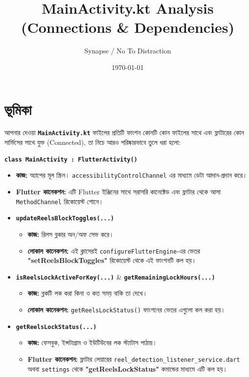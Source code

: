 \documentclass[12pt, a4paper]{article}
\title{\textbf{\Large MainActivity.kt Analysis\\ (Connections \& Dependencies)}}
\author{Synapse / No To Distraction}
\date{\today}
\begin{document}
\maketitle
\section*{ভূমিকা}
আপনার দেওয়া \textbf{\texttt{MainActivity.kt}} ফাইলের প্রতিটি ফাংশন কোনটি কোন ফাইলের সাথে এবং ফ্লাটারের কোন সার্ভিসের সাথে যুক্ত (Connected), তা নিচে আরও পরিষ্কারভাবে তুলে ধরা হলো:

\vspace{0.5cm}
\begin{tcolorbox}[colback=green!5!white,colframe=green!75!black,title={১. মূল ক্লাস এবং ভেরিয়েবল}]
\textbf{\texttt{class MainActivity : FlutterActivity()}}
\begin{itemize}[label=$\circ$]
    \item \textbf{কাজ:} অ্যাপের মূল স্ক্রিন। \texttt{accessibilityControlChannel} এর মাধ্যমে ডেটা আদান-প্রদান করে।
    \item \textbf{Flutter কানেকশন:} এটি Flutter ইঞ্জিনের সাথে সরাসরি কানেক্টেড এবং ফ্লাটার থেকে আসা \texttt{MethodChannel} রিকোয়েস্ট শোনে।
\end{itemize}
\end{tcolorbox}

\begin{tcolorbox}[colback=orange!5!white,colframe=orange!75!black,title={২. SharedPreferences সম্পর্কিত ফাংশন}]
\begin{itemize}[label=$\circ$]
    \item \textbf{\texttt{updateReelsBlockToggles(...)}}
    \begin{itemize}[label=--]
        \item \textbf{কাজ:} রিলস ব্লকার অন/অফ সেভ করে।
        \item \textbf{লোকাল কানেকশন:} এই ক্লাসেরই \texttt{configureFlutterEngine}-এর ভেতর \textbf{"setReelsBlockToggles"} রিকোয়েস্ট থেকে এই ফাংশনটি কল হয়।
    \end{itemize}
    \item \textbf{\texttt{isReelsLockActiveForKey(...)}} \& \textbf{\texttt{getRemainingLockHours(...)}}
    \begin{itemize}[label=--]
        \item \textbf{কাজ:} ব্লকটি লক করা কিনা ও কত সময় বাকি তা দেখে।
        \item \textbf{লোকাল কানেকশন:} \texttt{getReelsLockStatus()} ফাংশনের ভেতর এগুলো কল করা হয়।
    \end{itemize}
    \item \textbf{\texttt{getReelsLockStatus(...)}}
    \begin{itemize}[label=--]
        \item \textbf{কাজ:} ফেসবুক, ইন্সটাগ্রাম ও ইউটিউবের লক স্ট্যাটাস পাঠায়।
        \item \textbf{Flutter কানেকশন:} ফ্লাটার লেয়ারের \texttt{reel\_detection\_listener\_service.dart} অথবা \texttt{settings} থেকে \textbf{"getReelsLockStatus"} কমান্ডের মাধ্যমে এটি কল হয়।
    \end{itemize}
\end{itemize}
\end{tcolorbox}
\end{document}
